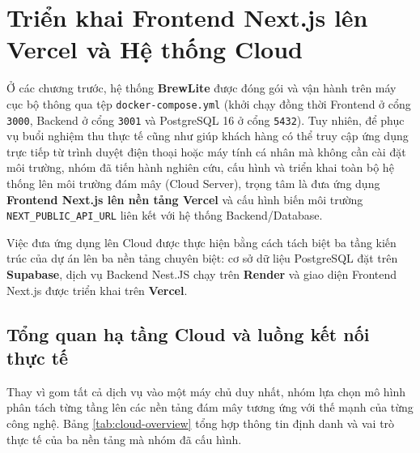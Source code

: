 
\section{Triển khai Frontend Next.js lên Vercel và Hệ thống Cloud}

Ở các chương trước, hệ thống \textbf{BrewLite} được đóng gói và vận hành trên máy cục bộ thông qua tệp \texttt{docker-compose.yml} (khởi chạy đồng thời Frontend ở cổng \texttt{3000}, Backend ở cổng \texttt{3001} và PostgreSQL 16 ở cổng \texttt{5432}). Tuy nhiên, để phục vụ buổi nghiệm thu thực tế cũng như giúp khách hàng có thể truy cập ứng dụng trực tiếp từ trình duyệt điện thoại hoặc máy tính cá nhân mà không cần cài đặt môi trường, nhóm đã tiến hành nghiên cứu, cấu hình và triển khai toàn bộ hệ thống lên môi trường đám mây (Cloud Server), trọng tâm là đưa ứng dụng \textbf{Frontend Next.js lên nền tảng Vercel} và cấu hình biến môi trường \texttt{NEXT\_PUBLIC\_API\_URL} liên kết với hệ thống Backend/Database.

Việc đưa ứng dụng lên Cloud được thực hiện bằng cách tách biệt ba tầng kiến trúc của dự án lên ba nền tảng chuyên biệt: cơ sở dữ liệu PostgreSQL đặt trên \textbf{Supabase}, dịch vụ Backend Nest.JS chạy trên \textbf{Render} và giao diện Frontend Next.js được triển khai trên \textbf{Vercel}.

\subsection{Tổng quan hạ tầng Cloud và luồng kết nối thực tế}

Thay vì gom tất cả dịch vụ vào một máy chủ duy nhất, nhóm lựa chọn mô hình phân tách từng tầng lên các nền tảng đám mây tương ứng với thế mạnh của từng công nghệ. Bảng \ref{tab:cloud-overview} tổng hợp thông tin định danh và vai trò thực tế của ba nền tảng mà nhóm đã cấu hình.

